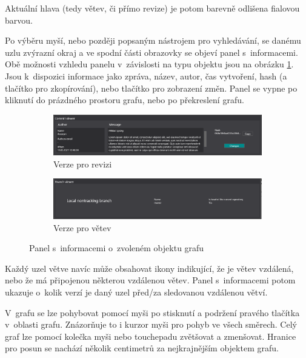 \documentclass[
  biblatex,
  glossaries,
  index
]{kidiplom}
\begin{document}
Aktuální hlava (tedy větev, či přímo revize) je potom barevně odlišena fialovou barvou.

Po výběru myší, nebo později popsaným nástrojem pro vyhledávání, se danému uzlu zvýrazní okraj a ve spodní části obrazovky se objeví panel s~informacemi. Obě možnosti vzhledu panelu v~závislosti na typu objektu jsou na obrázku \ref{fig:item-info}. Jsou k~dispozici informace jako zpráva, název, autor, čas vytvoření, hash (a tlačítko pro zkopírování), nebo tlačítko pro zobrazení změn. Panel se vypne po kliknutí do prázdného prostoru grafu, nebo po překreslení grafu.

\begin{figure}
\centering
\begin{subfigure}[b]{13cm}
   \includegraphics[width=1\linewidth]{commit-viewer.png}
   \caption{Verze pro revizi}

\vspace{5 mm}
\end{subfigure}
\begin{subfigure}[b]{13cm}
   \includegraphics[width=1\linewidth]{branch-viewer.png}
   \caption{Verze pro větev}
\end{subfigure}
\caption{Panel s~informacemi o~zvoleném objektu grafu}
\label{fig:item-info}
\end{figure}

Každý uzel větve navíc může obsahovat ikony indikující, že je větev vzdálená, nebo že má připojenou některou vzdálenou větev. Panel s~informacemi potom ukazuje o~kolik verzí je daný uzel před/za sledovanou vzdálenou větví.

V~grafu se lze pohybovat pomocí myši po stisknutí a podržení pravého tlačítka v~oblasti grafu. Znázorňuje to i kurzor myši pro pohyb ve všech směrech. Celý graf lze pomocí kolečka myši nebo touchepadu zvětšovat a zmenšovat. Hranice pro posun se nachází několik centimetrů za nejkrajnějším objektem grafu.
\end{document}
